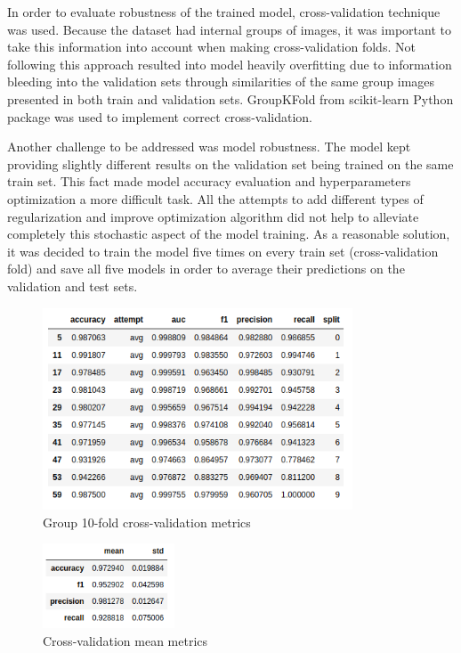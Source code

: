 \documentclass[a4paper]{article}
\begin{document}
    In order to evaluate robustness of the trained model, cross-validation technique was used. Because the dataset
    had internal groups of images, it was important to take this information into account when making cross-validation
    folds. Not following this approach resulted into model heavily overfitting due to information bleeding into the
    validation sets through similarities of the same group images presented in both train and validation sets.
    GroupKFold from scikit-learn Python package was used to implement correct cross-validation.
    
    Another challenge to be addressed was model robustness. The model kept providing slightly different results
    on the validation set being trained on the same train set. This fact made model accuracy evaluation and 
    hyperparameters optimization a more difficult task. All the attempts to add different types of regularization and 
    improve optimization algorithm did not help to alleviate completely this stochastic aspect of the model training.
    As a reasonable solution, it was decided to train the model five times on every train set (cross-validation fold)
    and save all five models in order to average their predictions on the validation and test sets.
    
    \begin{figure}[H]
        \centering
            \includegraphics[width=\textwidth,height=6cm,keepaspectratio]{cross-validation_metrics.png}
        \caption{Group 10-fold cross-validation metrics}
    \end{figure}
    
    \begin{figure}[H]
        \centering
            \includegraphics[width=\textwidth,height=2.5cm,keepaspectratio]{cross-validation_mean_metrics.png}
        \caption{Cross-validation mean metrics}
    \end{figure}
    
\end{document}
